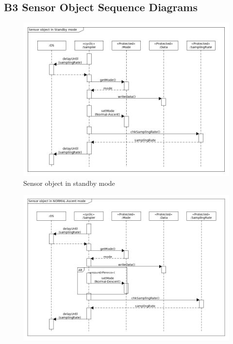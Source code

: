 \begin{landscape}
\subsection*{B3 Sensor Object Sequence Diagrams}
\begin{figure}[H]
    \centering
    \includegraphics[height=0.9\textwidth]{appendix/img/sensor-seq-dia-a.png}
    \caption{Sensor object in standby mode}
    \label{sensora}
\end{figure}
\begin{figure}[H]
    \centering
    \includegraphics[height=0.9\textwidth]{appendix/img/sensor-seq-dia-b.png}

\end{figure}
\end{landscape}
